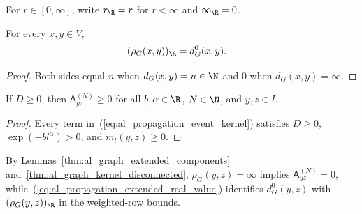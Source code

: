 For $r\in[0,\infty]$, write $r_{\R}=r$ for $r<\infty$ and $\infty_{\R}=0$.

\begin{lemma}
    \label{thm:al_graph_extended_real_value}
    \leanok
    For every $x,y\in V$,
    \begin{align}
        \label{eq:al_propagation_extended_real_value}
        (\rho_G(x,y))_{\R} & =d_G^0(x,y).
    \end{align}
\end{lemma}
\begin{proof}
    \leanok
    Both sides equal $n$ when $d_G(x,y)=n\in\N$ and $0$ when
    $d_G(x,y)=\infty$.
\end{proof}

\begin{lemma}
    \label{thm:al_graph_event_kernel_nonneg}
    \leanok
    If $D\ge0$, then $\mathsf A^{(N)}_{yz}\ge0$ for all $b,\alpha\in\R$,
    $N\in\N$, and $y,z\in I$.
\end{lemma}
\begin{proof}
    \leanok
    Every term in~(\ref{eq:al_propagation_event_kernel}) satisfies
    $D\ge0$, $\exp(-bl^\alpha)>0$, and $m_l(y,z)\ge0$.
\end{proof}

By Lemmas~\ref{thm:al_graph_extended_components}
and~\ref{thm:al_graph_kernel_disconnected}, $\rho_G(y,z)=\infty$ implies
$\mathsf A^{(N)}_{yz}=0$, while~(\ref{eq:al_propagation_extended_real_value})
identifies $d_G^0(y,z)$ with $(\rho_G(y,z))_{\R}$ in the weighted-row bounds.
